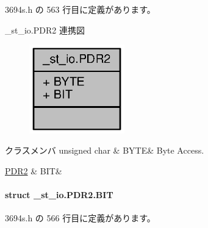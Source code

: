  3694s.\+h の 563 行目に定義があります。



\+\_\+st\+\_\+io.\+P\+D\+R2 連携図
\nopagebreak
\begin{figure}[H]
\begin{center}
\leavevmode
\includegraphics[width=117pt]{de/da6/union__st__io_8PDR2__coll__graph}
\end{center}
\end{figure}
\begin{DoxyFields}{クラスメンバ}
unsigned char\label{3694s_8h_ae409eb2ba6eb6801f52763ae370c350e}
&
B\+Y\+T\+E&
Byte Access. \\
\hline

\hyperlink{3694s_8h_df/d88/struct__st__io_8PDR2_8BIT}{P\+D\+R2}\label{3694s_8h_adb957fdc8000e1eef04a243f5199aa52}
&
B\+I\+T&
\\
\hline

\end{DoxyFields}
\label{struct__st__io_8PDR2_8BIT}
\paragraph{struct \+\_\+st\+\_\+io.\+P\+D\+R2.\+B\+I\+T}


 3694s.\+h の 566 行目に定義があります。



